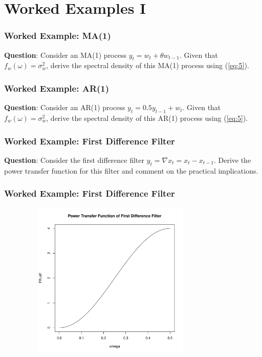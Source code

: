 \documentclass[%
xcolor=pdftex]{beamer}
\begin{document}
\section{Worked Examples I}
\frame{\tableofcontents[currentsection]}

\begin{frame}
\frametitle{Worked Example: MA(1)}

\textbf{Question}: Consider an MA(1) process $y_t = w_t + \theta w_{t-1}$. Given that $f_w(\omega) = \sigma_w^2$, derive the spectral density of this MA(1) process using (\ref{eq:5}).

\vspace{50mm}

\end{frame}

\begin{frame}
\frametitle{Worked Example: AR(1)}

\textbf{Question}: Consider an AR(1) process $y_t = 0.5 y_{t-1} + w_{t}$. Given that $f_w(\omega) = \sigma_w^2$, derive the spectral density of this AR(1) process using (\ref{eq:5}).

\vspace{50mm}

\end{frame}

\begin{frame}
\frametitle{Worked Example: First Difference Filter}

\textbf{Question}: Consider the first difference filter $y_t = \nabla x_t = x_t - x_{t-1}$. Derive the power transfer function for this filter and comment on the practical implications.

\vspace{50mm}

\end{frame}

\begin{frame}
\frametitle{Worked Example: First Difference Filter}

\includegraphics[width=110mm, height=75mm]{diff.pdf}

\end{frame}
\end{document}

